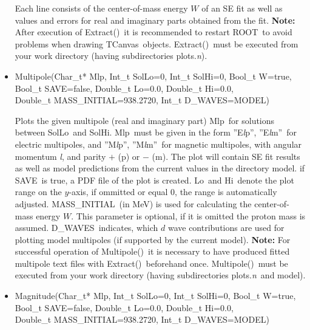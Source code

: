 \documentclass[a4paper,10pt]{article}
\def\tt{\ttfamily}
\def\rm{\rmfamily}
\begin{document}
\begin{itemize}
Each line consists of the center-of-mass energy $W$ of an SE fit as well as values and errors for real and imaginary
parts obtained from the fit. \textbf{Note:} After execution of \tt Extract()\rm\ it is recommended to restart
\tt ROOT\rm\ to avoid problems when drawing \tt TCanvas\rm\ objects. \tt Extract()\rm\ must be executed from your
work directory (having subdirectories \tt plots.\textit{n}\rm).

\item
\tt Multipole(Char\_t* Mlp, Int\_t SolLo=0, Int\_t SolHi=0, Bool\_t W=true,\\
\phantom{Multipole(}Bool\_t SAVE=false, Double\_t Lo=0.0, Double\_t Hi=0.0,\\
\phantom{Multipole(}Double\_t MASS\_INITIAL=938.2720, Int\_t D\_WAVES=MODEL)\rm

Plots the given multipole (real and imaginary part) \tt Mlp\rm\ for solutions between \tt SolLo\rm\ and \tt SolHi\rm.
\tt Mlp\rm\ must be given in the form \tt ''E\textit{l}p''\rm,
\tt ''E\textit{l}m''\rm\ 
for electric multipoles, and
\tt ''M\textit{l}p''\rm,
\tt ''M\textit{l}m''\rm\ 
for magnetic multipoles, with angular momentum \tt\textit{l}\rm, and parity
$+$ (\tt p\rm) or $-$ (\tt m\rm). The plot will contain SE fit results as well as model predictions from the current
values in the directory \tt model\rm.
if \tt SAVE\rm\ is true, a PDF file of the plot is created. \tt Lo\rm\ and \tt Hi\rm\ denote the plot range on the $y$-axis, 
if ommitted or equal 0, the range is automatically adjusted.
\tt MASS\_INITIAL\rm\ (in MeV) is used for calculating the center-of-mass energy $W$. This parameter 
is optional, if it is omitted the proton mass is assumed.
\tt D\_WAVES\rm\ indicates, which $d$ wave contributions are used for plotting model multipoles (if supported by the current model).
\textbf{Note:} For successful operation of \tt Multipole()\rm\ it is necessary to have produced
fitted multipole text files with \tt Extract()\rm\ beforehand once. \tt Multipole()\rm\ must be executed from your
work directory (having subdirectories \tt plots.\textit{n}\rm\ and \tt model\rm).

\item
\tt Magnitude(Char\_t* Mlp, Int\_t SolLo=0, Int\_t SolHi=0, Bool\_t W=true,\\
\phantom{Magnitude(}Bool\_t SAVE=false, Double\_t Lo=0.0, Double\_t Hi=0.0,\\
\phantom{Magnitude(}Double\_t MASS\_INITIAL=938.2720, Int\_t D\_WAVES=MODEL)\rm


\end{itemize}
\end{document}
